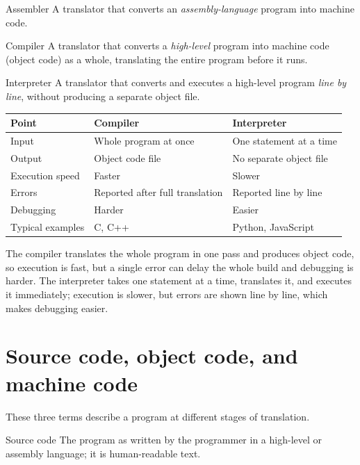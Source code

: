 \begin{definitionbox}{Assembler}
A translator that converts an \emph{assembly-language} program into machine
code.
\end{definitionbox}

\begin{definitionbox}{Compiler}
A translator that converts a \emph{high-level} program into machine code (object
code) as a whole, translating the entire program before it runs.
\end{definitionbox}

\begin{definitionbox}{Interpreter}
A translator that converts and executes a high-level program
\emph{line by line}, without producing a separate object file.
\end{definitionbox}

\begin{center}
\begin{tabular}{p{}p{}p{}}
\toprule
\textbf{Point} & \textbf{Compiler} & \textbf{Interpreter} \\
\midrule
Input & Whole program at once & One statement at a time \\
Output & Object code file & No separate object file \\
Execution speed & Faster & Slower \\
Errors & Reported after full translation & Reported line by line \\
Debugging & Harder & Easier \\
Typical examples & C, C++ & Python, JavaScript \\
\bottomrule
\end{tabular}
\end{center}

The compiler translates the whole program in one pass and produces object
code, so execution is fast, but a single error can delay the whole build and
debugging is harder. The interpreter takes one statement at a time, translates
it, and executes it immediately; execution is slower, but errors are shown
line by line, which makes debugging easier.

\section{Source code, object code, and machine code}
These three terms describe a program at different stages of translation.

\begin{definitionbox}{Source code}
The program as written by the programmer in a high-level or assembly language;
it is human-readable text.
\end{definitionbox}


